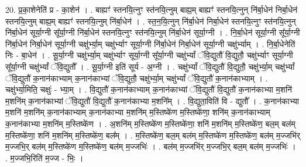 \documentclass[17pt]{extarticle}
\begin{document}
20. प्र॒का॒शेनेति॑ प्र - का॒शेन॑ । . बाह्यꣳ॑ स्तनयि॒त्नुꣳ स्त॑नयि॒त्नुम् बाह्य॒म् बाह्यꣳ॑ स्तनयि॒त्नुन् नि॑र्बा॒धेन॑ निर्बा॒धेन॑ स्तनयि॒त्नुम् बाह्य॒म् बाह्यꣳ॑ स्तनयि॒त्नुम् नि॑र्बा॒धेन॑ । . स्त॒न॒यि॒त्नुन् नि॑र्बा॒धेन॑ निर्बा॒धेन॑ स्तनयि॒त्नुꣳ स्त॑नयि॒त्नुन् नि॑र्बा॒धेन॑ सूर्या॒ग्नी सू᳚र्या॒ग्नी नि॑र्बा॒धेन॑ स्तनयि॒त्नुꣳ स्त॑नयि॒त्नुम् नि॑र्बा॒धेन॑ सूर्या॒ग्नी । . नि॒र्बा॒धेन॑ सूर्या॒ग्नी सू᳚र्या॒ग्नी नि॑र्बा॒धेन॑ निर्बा॒धेन॑ सूर्या॒ग्नी चक्षु॑र्भ्या॒म् चक्षु॑र्भ्याꣳ सूर्या॒ग्नी नि॑र्बा॒धेन॑ निर्बा॒धेन॑ सूर्या॒ग्नी चक्षु॑र्भ्याम् । . नि॒र्बा॒धेनेति॑ निः - बा॒धेन॑ । . सू॒र्या॒ग्नी चक्षु॑र्भ्या॒म् चक्षु॑र्भ्याꣳ सूर्या॒ग्नी सू᳚र्या॒ग्नी चक्षु॑र्भ्यां ॅवि॒द्युतौ॑ वि॒द्युतौ॒ चक्षु॑र्भ्याꣳ सूर्या॒ग्नी सू᳚र्या॒ग्नी चक्षु॑र्भ्यां ॅवि॒द्युतौ᳚ । . सू॒र्या॒ग्नी इति॑ सूर्य - अ॒ग्नी । . चक्षु॑र्भ्यां ॅवि॒द्युतौ॑ वि॒द्युतौ॒ चक्षु॑र्भ्या॒म् चक्षु॑र्भ्यां ॅवि॒द्युतौ॑ क॒नान॑काभ्याम् क॒नान॑काभ्यां ॅवि॒द्युतौ॒ चक्षु॑र्भ्या॒म् चक्षु॑र्भ्यां ॅवि॒द्युतौ॑ क॒नान॑काभ्याम् । . चक्षु॑र्भ्या॒मिति॒ चक्षुः॑ - भ्या॒म् । . वि॒द्युतौ॑ क॒नान॑काभ्याम् क॒नान॑काभ्यां ॅवि॒द्युतौ॑ वि॒द्युतौ॑ क॒नान॑काभ्या म॒शनि॑ म॒शनि॑म् क॒नान॑काभ्यां ॅवि॒द्युतौ॑ वि॒द्युतौ॑ क॒नान॑काभ्या म॒शनि᳚म् । . वि॒द्युता॒विति॑ वि - द्युतौ᳚ । . क॒नान॑काभ्या म॒शनि॑ म॒शनि॑म् क॒नान॑काभ्याम् क॒नान॑काभ्या म॒शनि॑म् म॒स्तिष्के॑ण म॒स्तिष्के॑णा॒ शनि॑म् क॒नान॑काभ्याम् क॒नान॑काभ्या म॒शनि॑म् म॒स्तिष्के॑ण । . अ॒शनि॑म् म॒स्तिष्के॑ण म॒स्तिष्के॑णा॒ शनि॑ म॒शनि॑म् म॒स्तिष्के॑ण॒ बल॒म् बल॑म् म॒स्तिष्के॑णा॒ शनि॑ म॒शनि॑म् म॒स्तिष्के॑ण॒ बल᳚म् । . म॒स्तिष्के॑ण॒ बल॒म् बल॑म् म॒स्तिष्के॑ण म॒स्तिष्के॑ण॒ बल॑म् म॒ज्जभि॑र् म॒ज्जभि॒र् बल॑म् म॒स्तिष्के॑ण म॒स्तिष्के॑ण॒ बल॑म् म॒ज्जभिः॑ । . बल॑म् म॒ज्जभि॑र् म॒ज्जभि॒र् बल॒म् बल॑म् म॒ज्जभिः॑ । . म॒ज्जभि॒रिति॑ म॒ज्ज - भिः॒ । \newline
\pagebreak
{}
\end{document}
